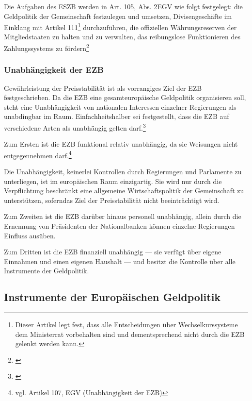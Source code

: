 \documentclass[
        onecolumn,
        a4paper,
        abstracton,
        parskip=half
        ,final
        ]{scrartcl}
\begin{document}
Die Aufgaben des \ac{ESZB} werden in Art. 105, Abs. 2\ac{EGV} wie folgt festgelegt: die Geldpolitik der Gemeinschaft festzulegen und umsetzen, Divisengesch{\"a}fte im Einklang mit Artikel 111\footnote[1999]{Dieser Artikel legt fest, dass alle Entscheidungen {\"u}ber Wechselkurssysteme dem Ministerrat vorbehalten sind und dementsprechend nicht durch die EZB gelenkt werden kann.} durchzuf{\"u}hren, die offiziellen W{\"a}hrungsreserven der Mitgliedstaaten zu halten und zu verwalten, das reibungslose Funktionieren des Zahlungssystems zu f{\"o}rdern\footnote[50]{\citep*[vgl.][S.555]{Basseler2010}}

\subsubsection{Unabh{\"a}ngigkeit der EZB}  %

Gew{\"a}hrleistung der Preisstabilit{\"a}t ist als vorrangiges Ziel der EZB festgeschrieben. Da die EZB eine gesamteurop{\"a}ische Geldpolitik organisieren soll, steht eine Unabh{\"a}ngigkeit von nationalen Interessen einzelner Regierungen als unabdingbar im Raum. Einfachheitshalber sei festgestellt, dass die EZB auf verschiedene Arten als unabh{\"a}ngig gelten darf.\footnote[51]{\citep*[vgl.][S.555-557]{Basseler2010}}

Zum Ersten ist die EZB funktional relativ unabh{\"a}ngig, da sie Weisungen nicht entgegennehmen darf.\footnote[34]{vgl. Artikel 107, \ac{EGV} (Unabh{\"a}ngigkeit der EZB)}

Die Unabh{\"a}ngigkeit, keinerlei Kontrollen durch Regierungen und Parlamente zu unterliegen, ist im europ{\"a}ischen Raum einzigartig. Sie wird nur durch die Verpflichtung beschr{\"a}nkt eine allgemeine Wirtschaftspolitik der Gemeinschaft zu unterst{\"u}tzen, soferndas Ziel der Preisstabilit{\"a}t nicht beeintr{\"a}chtigt wird.

Zum Zweiten ist die EZB dar{\"u}ber hinaus personell unabh{\"a}ngig, allein durch die Ernennung von Pr{\"a}sidenten der Nationalbanken k{\"o}nnen einzelne Regierungen Einfluss aus{\"u}ben.

Zum Dritten ist die EZB finanziell unabh{\"a}ngig --- sie verf{\"u}gt {\"u}ber eigene Einnahmen und einen eigenen Haushalt --- und besitzt die Kontrolle {\"u}ber alle Instrumente der Geldpolitik.

\subsection{Instrumente der Europ{\"a}ischen Geldpolitik}  %
\end{document}

